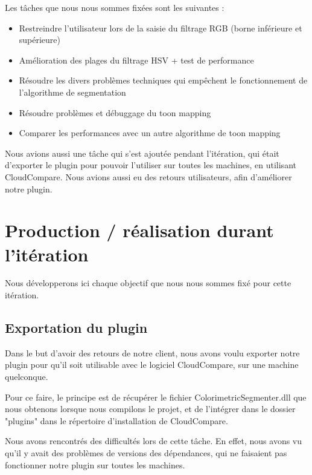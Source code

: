 \documentclass[12pt,titlepage,french]{article}
\begin{document}
Les tâches que nous nous sommes fixées sont les suivantes :

\begin{itemize}
    \item Restreindre l'utilisateur lors de la saisie du filtrage RGB (borne inférieure et supérieure)
    \item Amélioration des plages du filtrage HSV + test de performance
    \item Résoudre les divers problèmes techniques qui empêchent le fonctionnement de l'algorithme de segmentation
    \item Résoudre problèmes et débuggage du toon mapping
    \item Comparer les performances avec un autre algorithme de toon mapping
\end{itemize}

Nous avions aussi une tâche qui s'est ajoutée pendant l'itération, qui était d'exporter le plugin pour pouvoir l'utiliser sur toutes les machines, en utilisant CloudCompare. Nous avions aussi eu des retours utilisateurs, afin d'améliorer notre plugin.

\section{Production / réalisation durant l'itération}

Nous développerons ici chaque objectif que nous nous sommes fixé pour cette itération.


\subsection{Exportation du plugin}

Dans le but d'avoir des retours de notre client, nous avons voulu exporter notre plugin pour qu'il soit utilisable avec le logiciel CloudCompare, sur une machine quelconque. \newline

Pour ce faire, le principe est de récupérer le fichier ColorimetricSegmenter.dll que nous obtenons lorsque nous compilons le projet, et de l'intégrer dans le dossier "plugins" dans le répertoire d'installation de CloudCompare. \newline

Nous avons rencontrés des difficultés lors de cette tâche. En effet, nous avons vu qu'il y avait des problèmes de versions des dépendances, qui ne faisaient pas fonctionner notre plugin sur toutes les machines. \newline
\end{document}
